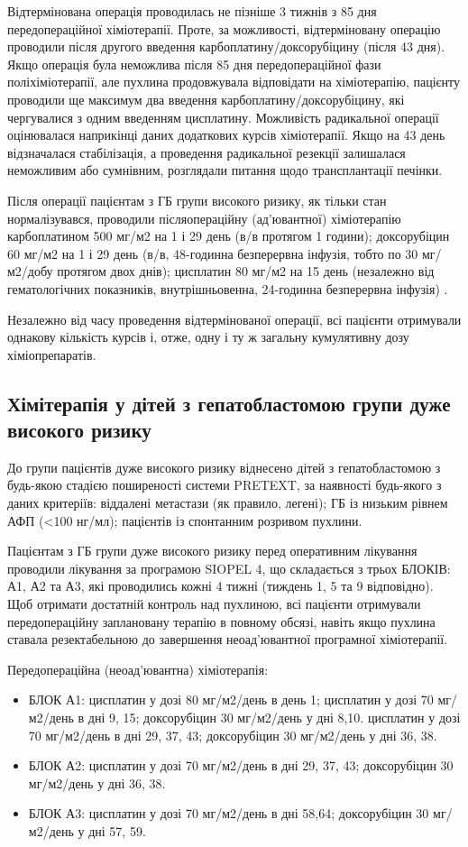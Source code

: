Відтермінована операція проводилась не пізніше 3 тижнів з 85 дня передопераційної хіміотерапії. Проте, за можливості, відтерміновану операцію проводили після другого введення карбоплатину/доксорубіцину (після 43 дня). Якщо операція була неможлива після 85 дня передопераційної фази поліхіміотерапії, але пухлина продовжувала відповідати на хіміотерапію, пацієнту проводили ще максимум два введення карбоплатину/доксорубіцину, які чергувалися з одним введенням цисплатину. Можливість радикальної операції оцінювалася наприкінці даних додаткових курсів хіміотерапії.
Якщо на 43 день відзначалася стабілізація, а проведення радикальної резекції залишалася неможливим або сумнівним,  розглядали питання щодо трансплантації печінки.

Після операції пацієнтам з ГБ групи високого ризику, як тільки стан нормалізувався, проводили післяопераційну (ад'ювантної) хіміотерапію карбоплатином 500 мг/м2 на 1 і 29 день (в/в протягом 1 години); доксорубіцин 60 мг/м2 на 1 і 29 день (в/в, 48-годинна безперервна інфузія, тобто по 30 мг/м2/добу протягом двох днів); цисплатин 80 мг/м2 на 15 день (незалежно від гематологічних показників, внутрішньовенна, 24-годинна безперервна інфузія) \cite{pmid28921939}.

Незалежно від часу проведення відтермінованої операції, всі пацієнти отримували однакову кількість курсів і, отже, одну і ту ж загальну кумулятивну дозу хіміопрепаратів.

\subsection{Хімітерапія у дітей з гепатобластомою групи дуже високого ризику}

До групи пацієнтів дуже високого ризику віднесено дітей з гепатобластомою з будь-якою стадією поширеності системи PRETEXT, за наявності будь-якого з даних критеріїв: віддалені метастази (як правило, легені); ГБ із низьким рівнем АФП (<100 нг/мл); пацієнтів із спонтанним розривом пухлини.

Пацієнтам з ГБ групи дуже високого ризику перед оперативним лікування проводили лікування за програмою SIOPEL 4, що складається з трьох БЛОКІВ: А1, А2 та А3, які проводились кожні 4 тижні (тиждень 1, 5 та 9 відповідно). Щоб отримати достатній контроль над пухлиною, всі пацієнти отримували передопераційну заплановану терапію в повному обсязі, навіть якщо пухлина ставала резектабельною до завершення неоад'ювантної програмної хіміотерапії\cite{pmid14966740}.

Передопераційна (неоад'ювантна) хіміотерапія:
\begin{itemize}
    \item БЛОК А1: цисплатин у дозі 80 мг/м2/день в день 1; цисплатин у дозі 70 мг/м2/день в дні 9, 15; доксорубіцин 30 мг/м2/день у дні 8,10. цисплатин у дозі 70 мг/м2/день в дні 29, 37, 43; доксорубіцин 30 мг/м2/день у дні 36, 38.
    \item БЛОК А2: цисплатин у дозі 70 мг/м2/день в дні 29, 37, 43; доксорубіцин 30 мг/м2/день у дні 36, 38.
    \item БЛОК А3: цисплатин у дозі 70 мг/м2/день в дні 58,64; доксорубіцин 30 мг/м2/день у дні 57, 59.
\end{itemize}

